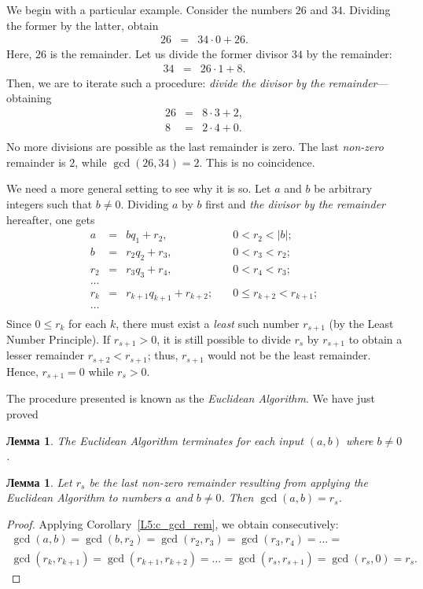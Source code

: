 \documentclass[12pt,notitlepage]{article}
\theoremstyle{plain}
\newtheorem{lemma}[thm]{Лемма}
\theoremstyle{definition}
\theoremstyle{plain}
\newcommand{\1}{\mathbf{1}}
\newcommand{\0}{\mathbf{0}}
\begin{document}
We begin with a particular example. Consider the numbers $26$ and $34$. Dividing the former by the latter, obtain
$$
\begin{array}{lcl}
	26 &=& 34\cdot0 + 26.
\end{array}
$$
Here, $26$ is the remainder. Let us divide the former divisor $34$ by the remainder:
$$
\begin{array}{lcl}
	34 &=& 26 \cdot 1 + 8.
\end{array}
$$
Then, we are to iterate such a procedure: \emph{divide the divisor by the remainder}---obtaining
$$
\begin{array}{lcl}
	26 &=& 8 \cdot 3 + 2,\\
	8 &=& 2 \cdot 4 + 0.\\
\end{array}
$$
No more divisions are possible as the last remainder is zero. The last \emph{non-zero} remainder is $2$, while $\gcd(26,34) = 2$. This is no coincidence.

We need a more general setting to see why it is so. Let $a$ and $b$ be arbitrary integers such that $b \neq 0$. Dividing $a$ by $b$ first and \emph{the divisor by the remainder} hereafter, one gets
$$\begin{array}{lcll}
	a &=& bq_1 + r_2,\quad &0 < r_2 < |b|;\\
	b &=& r_2 q_2 + r_3,\quad &0 < r_3 < r_2;\\
	r_2 &=& r_3 q_3 + r_4,\quad &0 < r_4 < r_3;\\
	\ldots&&&\\
	r_{k} &=& r_{k + 1} q_{k + 1} + r_{k+2};\quad &0\leqslant r_{k+2} < r_{k+1};\\
	\ldots&&&\\
\end{array}$$
Since $0 \leq r_k$ for each $k$, there must exist a \emph{least} such number $r_{s+1}$ (by the Least Number Principle). If $r_{s+1} > 0$, it is still possible to divide $r_{s}$ by $r_{s+1}$ to obtain a lesser remainder $r_{s+2} < r_{s+1}$; thus, $r_{s+1}$ would not be the least remainder. Hence, $r_{s+1} = 0$ while $r_s > 0$.

The procedure presented is known as the \emph{Euclidean Algorithm}. We have just proved 
\begin{lemma}
	The Euclidean Algorithm terminates for each input $(a, b)$ where $b \neq 0$.
\end{lemma}

\begin{lemma}
	Let $r_s$ be the last non-zero remainder resulting from applying the Euclidean Algorithm to numbers $a$ and $b \neq 0$. Then $\gcd(a, b)= r_s$. 
\end{lemma}
\begin{proof}
	Applying Corollary~\ref{L5:c_gcd_rem}, we obtain consecutively:
	\begin{multline*}
		\gcd(a, b) = \gcd(b, r_2) = \gcd(r_2, r_3) = \gcd(r_3, r_4) = \ldots =\\
		\gcd(r_{k}, r_{k+1}) = \gcd(r_{k+1}, r_{k+2}) = \ldots = \gcd(r_s, r_{s+1}) = \gcd(r_s, 0) = r_s.
	\end{multline*}
\end{proof}
\end{document}
